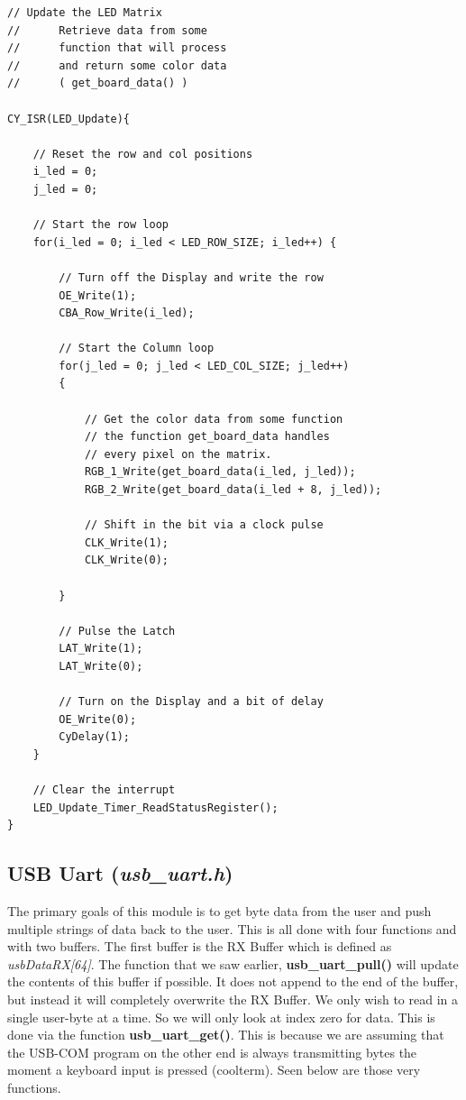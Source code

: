 \documentclass[a4paper, 12pt]{article}
\begin{document}
    \begin{verbatim}
// Update the LED Matrix
//      Retrieve data from some
//      function that will process
//      and return some color data
//      ( get_board_data() )

CY_ISR(LED_Update){
    
    // Reset the row and col positions
    i_led = 0;
    j_led = 0;
    
    // Start the row loop
    for(i_led = 0; i_led < LED_ROW_SIZE; i_led++) {
        
        // Turn off the Display and write the row
        OE_Write(1);
        CBA_Row_Write(i_led);
        
        // Start the Column loop
        for(j_led = 0; j_led < LED_COL_SIZE; j_led++)
        {
            
            // Get the color data from some function
            // the function get_board_data handles
            // every pixel on the matrix.
            RGB_1_Write(get_board_data(i_led, j_led));
            RGB_2_Write(get_board_data(i_led + 8, j_led));
                
            // Shift in the bit via a clock pulse
            CLK_Write(1);
            CLK_Write(0);

        }
        
        // Pulse the Latch
        LAT_Write(1);
        LAT_Write(0);
        
        // Turn on the Display and a bit of delay
        OE_Write(0);
        CyDelay(1);
    }
    
    // Clear the interrupt
    LED_Update_Timer_ReadStatusRegister();
}
    \end{verbatim}



    
    \subsection{USB Uart (\textit{usb\_uart.h})}

    The primary goals of this module is to get byte data from the user and
    push multiple strings of data back to the user. This is all done with
    four functions and with two buffers. The first buffer is the RX Buffer
    which is defined as \textit{usbDataRX[64]}. The function that we saw
    earlier, \textbf{usb\_uart\_pull()} will update the contents of this
    buffer if possible. It does not append to the end of the buffer, but
    instead it will completely overwrite the RX Buffer. We only wish to
    read in a single user-byte at a time. So we will only look at index zero
    for data. This is done via the function \textbf{usb\_uart\_get()}.
    This is because we are assuming that the USB-COM program on
    the other end is always transmitting bytes the moment a keyboard input is
    pressed (coolterm). Seen below are those very functions.
\end{document}
